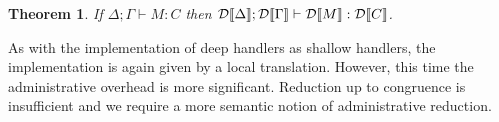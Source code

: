 \documentclass[12pt,phd,lfcs,twoside,openright,logo,leftchapter,normalheadings]{infthesis}
\theoremstyle{plain}
\newtheorem{theorem}{Theorem}[chapter]
\theoremstyle{definition}
\begin{document}
%

\begin{theorem}
If $\Delta; \Gamma \vdash M : C$ then $\mathcal{D}\llbracket \Delta \rrbracket;
\mathcal{D}\llbracket \Gamma \rrbracket \vdash \mathcal{D}\llbracket M \rrbracket : \mathcal{D}\llbracket C \rrbracket$.
\end{theorem}


\newcommand{\admin}{admin}
\newcommand{\approxa}{\gtrsim}

As with the implementation of deep handlers as shallow handlers, the
implementation is again given by a local translation. However, this
time the administrative overhead is more significant. Reduction up to
congruence is insufficient and we require a more semantic notion of
administrative reduction.
\end{document}
